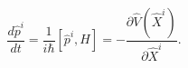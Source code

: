 \begin{equation}
\frac{d\hat{p}^{i}}{dt}=\frac{1}{i\hbar}[\hat{p}^{i},H]=-\frac{\partial
\widehat{V}(\widehat{X}^{i})}{\partial\widehat{X}^{i}}.\label{22}%
\end{equation}

